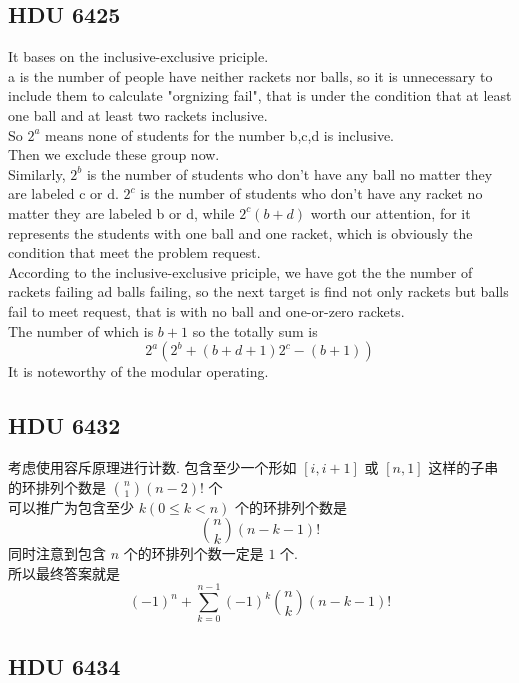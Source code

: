 \documentclass{article}
\begin{document}
    \subsection{\LARGE HDU 6425}
    It bases on the inclusive-exclusive priciple.\\
    a is the number of people have neither rackets nor balls, so it is unnecessary to include them to calculate "orgnizing fail", that is under the condition that at least one ball and at least two rackets inclusive.\\
    So $2^a$ means none of students for the number b,c,d is inclusive.\\
    Then we exclude these group now.\\
    Similarly, $2^b$ is the number of students who don't have any ball no matter they are labeled c or d. $2^c$ is the number of students who don't have any racket no matter they are labeled b or d, while $2^c(b+d)$ worth our attention, for it represents the students with one ball and one racket, which is obviously the condition that meet the problem request.\\
    According to the inclusive-exclusive priciple, we have got the the number of rackets failing ad balls failing, so the next target is find not only rackets but balls fail to meet request, that is with no ball and one-or-zero rackets.\\
    The number of which is $b+1$
    so the totally sum is
    \[2^a(2^b + (b+d+1)2^c - (b+1))\]
    It is noteworthy of the modular operating.

    \subsection{\LARGE HDU 6432}

    考虑使用容斥原理进行计数.
    包含至少一个形如 $[i, i + 1]$ 或 $[n, 1]$ 这样的子串的环排列个数是 $\binom{n}{1} (n - 2)!$ 个\\
    可以推广为包含至少 $k (0 \leq k < n)$ 个的环排列个数是
    \[
        \binom{n}{k}(n-k-1)!
    \]
    同时注意到包含 $n$ 个的环排列个数一定是 $1$ 个.\\
    所以最终答案就是\\
    $$(-1)^n + \sum_{k = 0}^{n - 1} (-1)^k \binom{n}{k} (n - k - 1)!$$

    \subsection{\LARGE HDU 6434}
\end{document}
